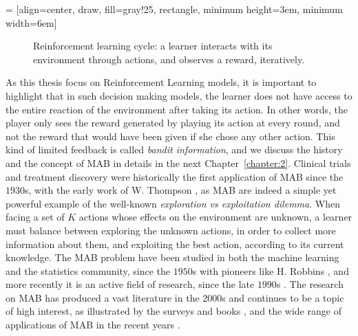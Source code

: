  = [align=center, draw, fill=gray!25, rectangle, minimum height=3em, minimum width=6em]
\begin{figure}[h!]
    \centering
\caption{Reinforcement learning cycle: a learner interacts with its environment through actions, and observes a reward, iteratively.}
\label{fig:1:ReinforcementLearningCycle}
\end{figure}


As this thesis focus on Reinforcement Learning models,
it is important to highlight that in such decision making models, the learner does not have access to the entire reaction of the environment after taking its action.
%
In other words, the player only sees the reward generated by playing its action at every round, and not the reward that would have been given if she chose any other action.
This kind of limited feedback is called \emph{bandit information}, and we discuss the history and the concept of MAB in details in the next Chapter~\ref{chapter:2}.
Clinical trials and treatment discovery were historically the first application of MAB since the $1930$s, with the early work of W. Thompson \cite{Thompson33},
%
as MAB are indeed a simple yet powerful example of the well-known \emph{exploration vs exploitation dilemma}.
When facing a set of $K$ actions whose effects on the environment are unknown, a learner must balance between
exploring the unknown actions, in order to collect more information about them,
and exploiting the best action, according to its current knowledge.
%
The MAB problem have been studied in both the machine learning and the statistics community, since the $1950$s with pioneers like H. Robbins \cite{Robbins52}, and more recently it is an active field of research, since the late $1990$s \cite{Anantharam87a,Anantharam87b,auer1995gambling,Agrawal95}.
The research on MAB has produced a vast literature in the $2000$s \cite{Auer02,Auer02NonStochastic,Audibert2009minimax} and continues to be a topic of high interest, as illustrated by the surveys and books \cite{Bubeck12,LattimoreBanditAlgorithmsBook,Slivkins2019}, and the wide range of applications of MAB in the recent years \cite{bouneffouf2019survey}.



